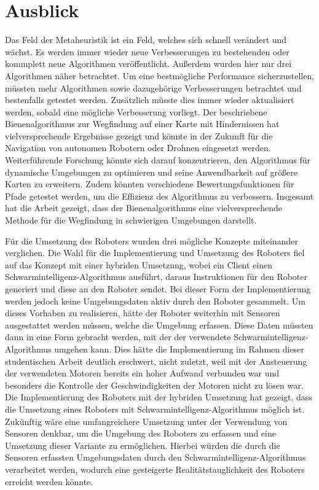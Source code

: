 
\section{Ausblick}
Das Feld der Metaheuristik ist ein Feld, welches sich schnell verändert und wächst. Es werden immer wieder neue Verbesserungen zu bestehenden oder kommplett neue Algorithmen veröffentlicht. Außerdem wurden hier nur drei Algorithmen näher betrachtet. Um eine bestmögliche Performance sicherzustellen, müssten mehr Algorithmen sowie dazugehörige Verbesserungen betrachtet und bestenfalls getestet werden. Zusätzlich müsste dies immer wieder aktualisiert werden, sobald eine mögliche Verbesserung vorliegt.
Der beschriebene Bienenalgorithmus zur Wegfindung auf einer Karte mit Hindernissen hat vielversprechende Ergebnisse gezeigt und könnte in der Zukunft für die Navigation von autonomen Robotern oder Drohnen eingesetzt werden. Weiterführende Forschung könnte sich darauf konzentrieren, den Algorithmus für dynamische Umgebungen zu optimieren und seine Anwendbarkeit auf größere Karten zu erweitern. Zudem könnten verschiedene Bewertungsfunktionen für Pfade getestet werden, um die Effizienz des Algorithmus zu verbessern. Insgesamt hat die Arbeit gezeigt, dass der Bienenalgorithmus eine vielversprechende Methode für die Wegfindung in schwierigen Umgebungen darstellt.

Für die Umsetzung des Roboters wurden drei mögliche Konzepte miteinander verglichen. Die Wahl für die Implementierung und Umsetzung des Roboters fiel auf das Konzept mit einer hybriden Umsetzung, wobei ein Client einen Schwarmintelligenz-Algorithmus ausführt, daraus Instruktionen für den Roboter generiert und diese an den Roboter sendet. Bei dieser Form der Implementierung werden jedoch keine Umgebungsdaten aktiv durch den Roboter gesammelt. Um dieses Vorhaben zu realisieren, hätte der Roboter weiterhin mit Sensoren ausgestattet werden müssen, welche die Umgebung erfassen. Diese Daten müssten dann in eine Form gebracht werden, mit der der verwendete Schwarmintelligenz-Algorithmus umgehen kann. Dies hätte die Implementierung im Rahmen dieser studentischen Arbeit deutlich erschwert, nicht zuletzt, weil mit der Ansteuerung der verwendeten Motoren bereits ein hoher Aufwand verbunden war und besonders die Kontrolle der Geschwindigkeiten der Motoren nicht zu lösen war. Die Implementierung des Roboters mit der hybriden Umsetzung hat gezeigt, dass die Umsetzung eines Roboters mit Schwarmintelligenz-Algorithmus möglich ist. Zukünftig wäre eine umfangreichere Umsetzung unter der Verwendung von Sensoren denkbar, um die Umgebung des Roboters zu erfassen und eine Umsetzung dieser Variante zu ermöglichen. Hierbei würden die durch die Sensoren erfassten Umgebungsdaten durch den Schwarmintelligenz-Algorithmus verarbeitet werden, wodurch eine gesteigerte Realitätstauglichkeit des Roboters erreicht werden könnte.